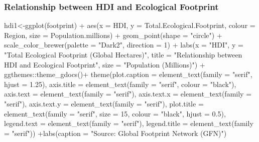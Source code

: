 \documentclass[
]{article}
\newenvironment{Shaded}{\begin{snugshade}}{\end{snugshade}}
\newcommand{\AttributeTok}[1]{\textcolor[rgb]{0.77,0.63,0.00}{#1}}
\newcommand{\DecValTok}[1]{\textcolor[rgb]{0.00,0.00,0.81}{#1}}
\newcommand{\FloatTok}[1]{\textcolor[rgb]{0.00,0.00,0.81}{#1}}
\newcommand{\FunctionTok}[1]{\textcolor[rgb]{0.00,0.00,0.00}{#1}}
\newcommand{\NormalTok}[1]{#1}
\newcommand{\OtherTok}[1]{\textcolor[rgb]{0.56,0.35,0.01}{#1}}
\newcommand{\SpecialCharTok}[1]{\textcolor[rgb]{0.00,0.00,0.00}{#1}}
\newcommand{\StringTok}[1]{\textcolor[rgb]{0.31,0.60,0.02}{#1}}
\begin{document}
\hypertarget{relationship-between-hdi-and-ecological-footprint}{%
\subsubsection{Relationship between HDI and Ecological
Footprint}\label{relationship-between-hdi-and-ecological-footprint}}

\begin{Shaded}
\begin{Highlighting}[]
\NormalTok{hdi1}\OtherTok{\textless{}{-}}\FunctionTok{ggplot}\NormalTok{(footprint) }\SpecialCharTok{+}
 \FunctionTok{aes}\NormalTok{(}\AttributeTok{x =}\NormalTok{ HDI, }\AttributeTok{y =}\NormalTok{ Total.Ecological.Footprint, }\AttributeTok{colour =}\NormalTok{ Region, }\AttributeTok{size =}\NormalTok{ Population.millions) }\SpecialCharTok{+}
 \FunctionTok{geom\_point}\NormalTok{(}\AttributeTok{shape =} \StringTok{"circle"}\NormalTok{) }\SpecialCharTok{+}
 \FunctionTok{scale\_color\_brewer}\NormalTok{(}\AttributeTok{palette =} \StringTok{"Dark2"}\NormalTok{, }\AttributeTok{direction =} \DecValTok{1}\NormalTok{) }\SpecialCharTok{+}
 \FunctionTok{labs}\NormalTok{(}\AttributeTok{x =} \StringTok{"HDI"}\NormalTok{, }
 \AttributeTok{y =} \StringTok{"Total Ecological Footprint (Global Hectares)"}\NormalTok{, }\AttributeTok{title =} \StringTok{"Relationship between HDI and Ecological Footprint"}\NormalTok{, }
 \AttributeTok{size =} \StringTok{"Population (Millions)"}\NormalTok{) }\SpecialCharTok{+}
\NormalTok{ ggthemes}\SpecialCharTok{::}\FunctionTok{theme\_gdocs}\NormalTok{()}\SpecialCharTok{+} \FunctionTok{theme}\NormalTok{(}\AttributeTok{plot.caption =} \FunctionTok{element\_text}\NormalTok{(}\AttributeTok{family =} \StringTok{"serif"}\NormalTok{,}
    \AttributeTok{hjust =} \FloatTok{1.25}\NormalTok{), }\AttributeTok{axis.title =} \FunctionTok{element\_text}\NormalTok{(}\AttributeTok{family =} \StringTok{"serif"}\NormalTok{,}
    \AttributeTok{colour =} \StringTok{"black"}\NormalTok{), }\AttributeTok{axis.text =} \FunctionTok{element\_text}\NormalTok{(}\AttributeTok{family =} \StringTok{"serif"}\NormalTok{),}
    \AttributeTok{axis.text.x =} \FunctionTok{element\_text}\NormalTok{(}\AttributeTok{family =} \StringTok{"serif"}\NormalTok{),}
    \AttributeTok{axis.text.y =} \FunctionTok{element\_text}\NormalTok{(}\AttributeTok{family =} \StringTok{"serif"}\NormalTok{),}
    \AttributeTok{plot.title =} \FunctionTok{element\_text}\NormalTok{(}\AttributeTok{family =} \StringTok{"serif"}\NormalTok{,}
        \AttributeTok{size =} \DecValTok{15}\NormalTok{, }\AttributeTok{colour =} \StringTok{"black"}\NormalTok{, }\AttributeTok{hjust =} \FloatTok{0.5}\NormalTok{),}
    \AttributeTok{legend.text =} \FunctionTok{element\_text}\NormalTok{(}\AttributeTok{family =} \StringTok{"serif"}\NormalTok{),}
    \AttributeTok{legend.title =} \FunctionTok{element\_text}\NormalTok{(}\AttributeTok{family =} \StringTok{"serif"}\NormalTok{)) }\SpecialCharTok{+}\FunctionTok{labs}\NormalTok{(}\AttributeTok{caption =} \StringTok{"Source: Global Footprint Network (GFN)"}\NormalTok{)}


\end{Highlighting}
\end{Shaded}
\end{document}
